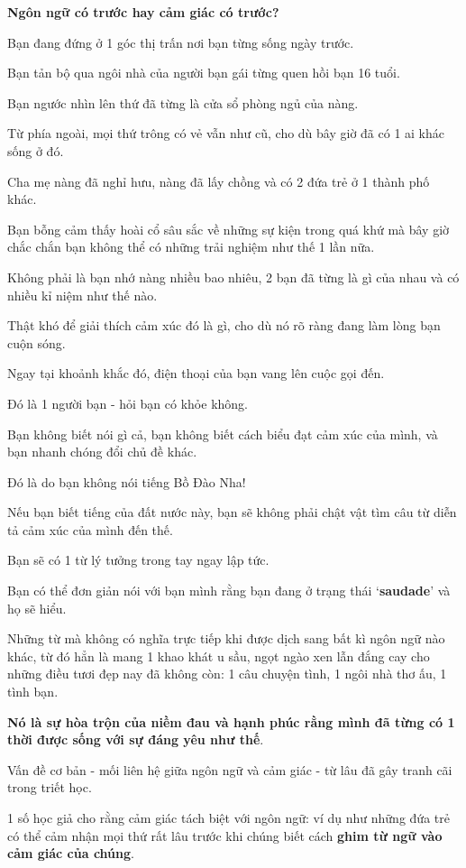 \documentclass{book}
\numberwithin{equation}{section}
\begin{document}
\textbf{ Ngôn ngữ có trước hay cảm giác có trước?}

%
Bạn đang đứng ở 1 góc thị trấn nơi bạn từng sống ngày trước.

Bạn tản bộ qua ngôi nhà của người bạn gái từng quen hồi bạn 16 tuổi.

Bạn ngước nhìn lên thứ đã từng là cửa sổ phòng ngủ của nàng.

Từ phía ngoài, mọi thứ trông có vẻ vẫn như cũ, cho dù bây giờ đã có 1 ai khác sống ở đó.

Cha mẹ nàng đã nghỉ hưu, nàng đã lấy chồng và có 2 đứa trẻ ở 1 thành phố khác.

Bạn bỗng cảm thấy hoài cổ sâu sắc về những sự kiện trong quá khứ mà bây giờ chắc chắn bạn không thể có những trải nghiệm như thế 1 lần nữa.

Không phải là bạn nhớ nàng nhiều bao nhiêu, 2 bạn đã từng là gì của nhau và có nhiều kỉ niệm như thế nào.

Thật khó để giải thích cảm xúc đó là gì, cho dù nó rõ ràng đang làm lòng bạn cuộn sóng.

Ngay tại khoảnh khắc đó, điện thoại của bạn vang lên cuộc gọi đến.

Đó là 1 người bạn - hỏi bạn có khỏe không.

Bạn không biết nói gì cả, bạn không biết cách biểu đạt cảm xúc của mình, và bạn nhanh chóng đổi chủ đề khác.

%
Đó là do bạn không nói tiếng Bồ Đào Nha!

Nếu bạn biết tiếng của đất nước này, bạn sẽ không phải chật vật tìm câu từ diễn tả cảm xúc của mình đến thế.

Bạn sẽ có 1 từ lý tưởng trong tay ngay lập tức.

Bạn có thể đơn giản nói với bạn mình rằng bạn đang ở trạng thái `\textbf{saudade}' và họ sẽ hiểu.

Những từ mà không có nghĩa trực tiếp khi được dịch sang bất kì ngôn ngữ nào khác, từ đó hẳn là mang 1 khao khát u sầu, ngọt ngào xen lẫn đắng cay cho những điều tươi đẹp nay đã không còn: 1 câu chuyện tình, 1 ngôi nhà thơ ấu, 1 tình bạn.

\textbf{Nó là sự hòa trộn của niềm đau và hạnh phúc rằng mình đã từng có 1 thời được sống với sự đáng yêu như thế}.

%
Vấn đề cơ bản - mối liên hệ giữa ngôn ngữ và cảm giác - từ lâu đã gây tranh cãi trong triết học.

1 số học giả cho rằng cảm giác tách biệt với ngôn ngữ: ví dụ như những đứa trẻ có thể cảm nhận mọi thứ rất lâu trước khi chúng biết cách \textbf{ghim từ ngữ vào cảm giác của chúng}.
\end{document}
